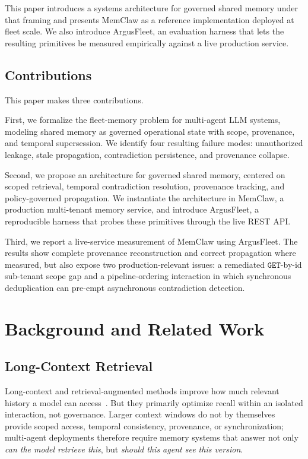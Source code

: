 \documentclass[10pt,twocolumn,letterpaper]{article}
\begin{document}
This paper introduces a systems architecture for governed shared memory under that framing and presents MemClaw as a reference implementation deployed at fleet scale. We also introduce ArgusFleet, an evaluation harness that lets the resulting primitives be measured empirically against a live production service.


\subsection{Contributions}

This paper makes three contributions.

First, we formalize the fleet-memory problem for multi-agent LLM systems, modeling shared memory as governed operational state with scope, provenance, and temporal supersession. We identify four resulting failure modes: unauthorized leakage, stale propagation, contradiction persistence, and provenance collapse.

Second, we propose an architecture for governed shared memory, centered on scoped retrieval, temporal contradiction resolution, provenance tracking, and policy-governed propagation. We instantiate the architecture in MemClaw, a production multi-tenant memory service, and introduce ArgusFleet, a reproducible harness that probes these primitives through the live REST API.

Third, we report a live-service measurement of MemClaw using ArgusFleet. The results show complete provenance reconstruction and correct propagation where measured, but also expose two production-relevant issues: a remediated \(\mathtt{GET}\)-by-id sub-tenant scope gap and a pipeline-ordering interaction in which synchronous deduplication can pre-empt asynchronous contradiction detection.

\section{Background and Related Work}

\subsection{Long-Context Retrieval}

Long-context and retrieval-augmented methods improve how much relevant history a model can access~\citep{longcontext_survey,rag2020}. But they primarily optimize recall within an isolated interaction, not governance. Larger context windows do not by themselves provide scoped access, temporal consistency, provenance, or synchronization; multi-agent deployments therefore require memory systems that answer not only \emph{can the model retrieve this}, but \emph{should this agent see this version}.
\end{document}
